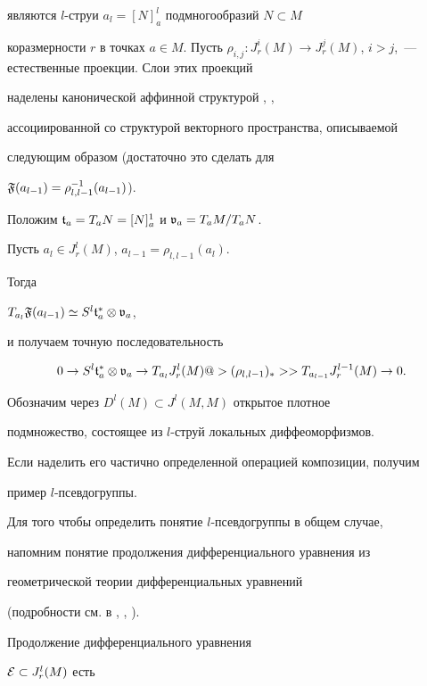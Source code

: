 являются $l$-струи $a_l = [N]_a^l$ подмногообразий $N \subset M$


коразмерности $r$ в точках $a \in M$. Пусть $\rho_{i,j} : J^i_r(M) \to


J^j_r(M)$, $i>j$,~--- естественные проекции. Слои этих проекций


наделены канонической аффинной структурой \cite{KLV}, \cite{Ly},


ассоциированной со структурой векторного пространства, описываемой


следующим образом (достаточно это сделать для


$\frak{F}(a_{l-1})=\rho^{-1}_{l,l-1}(a_{l-1})$).


Положим ${\frak t}_a=T_aN=[N]^1_a$ и ${\frak v}_a=T_aM/T_aN$.


Пусть $a_l\in J^l_r(M)$, $a_{l-1}=\rho_{l,l-1}(a_l)$.


Тогда


$T_{a_l}{\frak F}(a_{l-1})\simeq S^l{\frak t}^*_a\otimes{\frak v}_a$,


и получаем точную последовательность


$$


0\to S^l\tf^*_a\ot\vg_a\to


T_{a_l}J^l_r(M)@>{(\rho_{l,l-1})_*}>>


T_{a_{l-1}}J^{l-1}_r(M)\to 0.


$$








Обозначим через $D^l(M)\subset J^l(M,M)$ открытое плотное


подмножество, состоящее из $l$-струй локальных диффеоморфизмов.


Если наделить его частично определенной операцией композиции, получим


пример $l$-псевдогруппы.





Для того чтобы определить понятие $l$-псевдогруппы в общем случае,


напомним понятие продолжения дифференциального уравнения из


геометрической теории дифференциальных уравнений


(подробности см. в \cite{KLV}, \cite{Ly}, \cite{Gu}).


Продолжение дифференциального уравнения


${\cal E}\subset J^l_r(M)$ есть


$$


